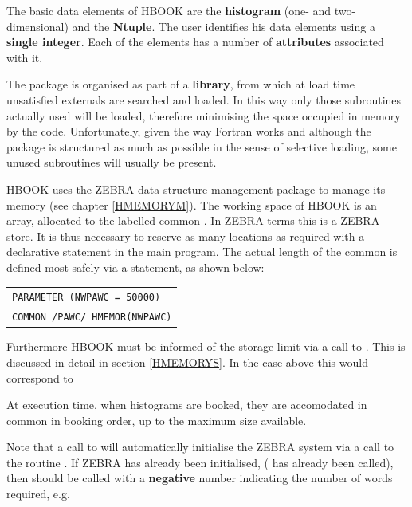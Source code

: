 The basic data elements of HBOOK are the {\bf histogram} (one-
and two-dimensional) and the {\bf Ntuple}. The user identifies
his data elements using a {\bf single integer}. Each of the
elements has a number of {\bf attributes} associated with it.

The package is organised as part of a {\bf library}, from which
at load time unsatisfied externals are searched and loaded.
In this way only those subroutines actually used will be
loaded, therefore minimising the space occupied in memory by the code.
Unfortunately, given the way Fortran
works and although the package is structured as much as possible in the
sense of selective loading, some unused subroutines will usually be
present.

\finalnewpage

HBOOK uses the ZEBRA \cite{bib-ZEBRA} data structure
management package to manage its memory (see chapter \ref{HMEMORYM}).
The working space of HBOOK is an array, allocated to the labelled
common .
In ZEBRA terms this is a ZEBRA store.
It is thus necessary to reserve as many locations as required with a
declarative statement in the main program.
The actual length of the common is defined most safely via 
a  statement, as shown below:

\begin{center}
\begin{tabular}{|>{\tt}l|}
\hline
PARAMETER (NWPAWC = 50000)\\
COMMON /PAWC/ HMEMOR(NWPAWC)\\
\hline
\end{tabular}
\end{center}

Furthermore HBOOK must be informed of the storage 
limit via a call to .
This is discussed in detail in section \vref{HMEMORYS}.
In the case above this would correspond to

\begin{center}
\end{center}
\Rind[HLIMIT]{}
 
At execution time, when histograms are booked, they are accomodated
in common  in booking order, up to the maximum size available.

Note that a call to  will automatically initialise the ZEBRA system
via a call to the routine .
If ZEBRA has already been initialised, ( has already been called),
then  should be called with a
{\bf negative} number indicating the number of words required, e.g.

